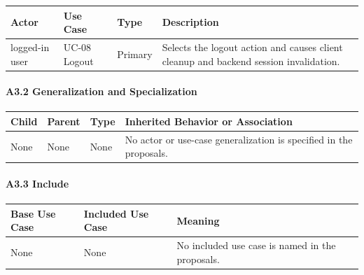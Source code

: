 \documentclass[12pt]{article}
\renewcommand{\baselinestretch}{1.5}
\begin{document}
\begingroup
\small
\renewcommand{\baselinestretch}{1.0}\selectfont
\renewcommand{\arraystretch}{1.15}
\setlength{\tabcolsep}{6pt}
\begin{longtable}{|>{\raggedright\arraybackslash}p{}|>{\raggedright\arraybackslash}p{}|>{\raggedright\arraybackslash}p{}|>{\raggedright\arraybackslash}p{}|}
\hline
\textbf{Actor} & \textbf{Use Case} & \textbf{Type} & \textbf{Description} \\ \hline
\endhead
logged-in user & UC-08 Logout & Primary & Selects the logout action and causes client cleanup and backend session invalidation. \\ \hline
\end{longtable}
\endgroup
\par\medskip

\hypertarget{sec:a3-2-generalization-and-specialization}{}
\paragraph*{A3.2 Generalization and Specialization}
\par\medskip

\begingroup
\small
\renewcommand{\baselinestretch}{1.0}\selectfont
\renewcommand{\arraystretch}{1.15}
\setlength{\tabcolsep}{6pt}
\begin{longtable}{|>{\raggedright\arraybackslash}p{}|>{\raggedright\arraybackslash}p{}|>{\raggedright\arraybackslash}p{}|>{\raggedright\arraybackslash}p{}|}
\hline
\textbf{Child} & \textbf{Parent} & \textbf{Type} & \textbf{Inherited Behavior or Association} \\ \hline
\endhead
None & None & None & No actor or use-case generalization is specified in the proposals. \\ \hline
\end{longtable}
\endgroup
\par\medskip

\hypertarget{sec:a3-3-include}{}
\paragraph*{A3.3 Include}
\par\medskip

\begingroup
\small
\renewcommand{\baselinestretch}{1.0}\selectfont
\renewcommand{\arraystretch}{1.15}
\setlength{\tabcolsep}{6pt}
\begin{longtable}{|>{\raggedright\arraybackslash}p{}|>{\raggedright\arraybackslash}p{}|>{\raggedright\arraybackslash}p{}|}
\hline
\textbf{Base Use Case} & \textbf{Included Use Case} & \textbf{Meaning} \\ \hline
\endhead
None & None & No included use case is named in the proposals. \\ \hline
\end{longtable}
\endgroup
\par\medskip
\end{document}
